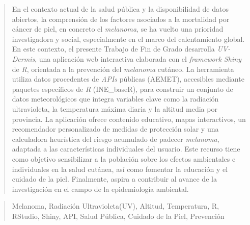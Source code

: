 \documentclass[a4paper,12pt,twoside]{memoir}
\begin{document}
\frontmatter

\renewcommand*\abstractname{Resumen}
\begin{abstract}
En el contexto actual de la salud pública y la disponibilidad de datos abiertos, la comprensión de los factores asociados a la mortalidad por cáncer de piel, en concreto el \textit{melanoma}, se ha vuelto una prioridad investigadora y social, especialmente en el marco del calentamiento global.
En este contexto, el presente Trabajo de Fin de Grado desarrolla \textit{UV-Dermis}, una aplicación web interactiva elaborada con el \textit{framework Shiny} de \textit{R}, orientada a la prevención del \textit{melanoma} cutáneo. La herramienta utiliza datos procedentes de \textit{APIs} públicas (AEMET), accesibles mediante paquetes específicos de \textit{R} (INE\_baseR), para construir un conjunto de datos meteorológicos que integra variables clave como la radiación ultravioleta, la temperatura máxima diaria y la altitud media por provincia. La aplicación ofrece contenido educativo, mapas interactivos, un recomendador personalizado de medidas de protección solar y una calculadora heurística del riesgo acumulado de padecer \textit{melanoma}, adaptada a las características individuales del usuario. 
Este recurso tiene como objetivo sensibilizar a la población sobre los efectos ambientales e individuales en la salud cutánea, así como fomentar la educación y el cuidado de la piel. Finalmente, aspira a contribuir al avance de la investigación en el campo de la epidemiología ambiental.


\end{abstract}

\renewcommand*\abstractname{Descriptores}
 \begin{abstract}
Melanoma, Radiación Ultravioleta(UV), Altitud, Temperatura, R, RStudio, Shiny, API, Salud Pública, Cuidado de la Piel, Prevención
\end{abstract}

\cleardoublepage
\end{document}

